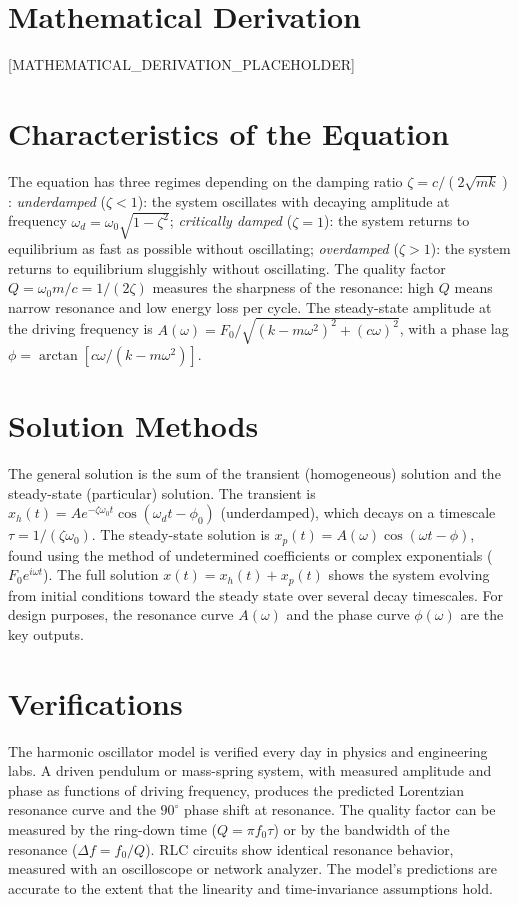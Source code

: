 \documentclass[11pt,openright]{book}
\begin{document}
\section*{Mathematical Derivation}

[MATHEMATICAL_DERIVATION_PLACEHOLDER]

\section*{Characteristics of the Equation}

The equation has three regimes depending on the damping ratio $\zeta = c/(2\sqrt{mk})$: \textit{underdamped} ($\zeta < 1$): the system oscillates with decaying amplitude at frequency $\omega_d = \omega_0\sqrt{1-\zeta^2}$; \textit{critically damped} ($\zeta = 1$): the system returns to equilibrium as fast as possible without oscillating; \textit{overdamped} ($\zeta > 1$): the system returns to equilibrium sluggishly without oscillating. The quality factor $Q = \omega_0 m/c = 1/(2\zeta)$ measures the sharpness of the resonance: high $Q$ means narrow resonance and low energy loss per cycle. The steady-state amplitude at the driving frequency is $A(\omega) = F_0/\sqrt{(k - m\omega^2)^2 + (c\omega)^2}$, with a phase lag $\phi = \arctan[c\omega/(k - m\omega^2)]$.
\section*{Solution Methods}

The general solution is the sum of the transient (homogeneous) solution and the steady-state (particular) solution. The transient is $x_h(t) = Ae^{-\zeta\omega_0 t}\cos(\omega_d t - \phi_0)$ (underdamped), which decays on a timescale $\tau = 1/(\zeta\omega_0)$. The steady-state solution is $x_p(t) = A(\omega)\cos(\omega t - \phi)$, found using the method of undetermined coefficients or complex exponentials ($F_0 e^{i\omega t}$). The full solution $x(t) = x_h(t) + x_p(t)$ shows the system evolving from initial conditions toward the steady state over several decay timescales. For design purposes, the resonance curve $A(\omega)$ and the phase curve $\phi(\omega)$ are the key outputs.
\section*{Verifications}

The harmonic oscillator model is verified every day in physics and engineering labs. A driven pendulum or mass-spring system, with measured amplitude and phase as functions of driving frequency, produces the predicted Lorentzian resonance curve and the $90^\circ$ phase shift at resonance. The quality factor can be measured by the ring-down time ($Q = \pi f_0\tau$) or by the bandwidth of the resonance ($\Delta f = f_0/Q$). RLC circuits show identical resonance behavior, measured with an oscilloscope or network analyzer. The model's predictions are accurate to the extent that the linearity and time-invariance assumptions hold.
\end{document}
